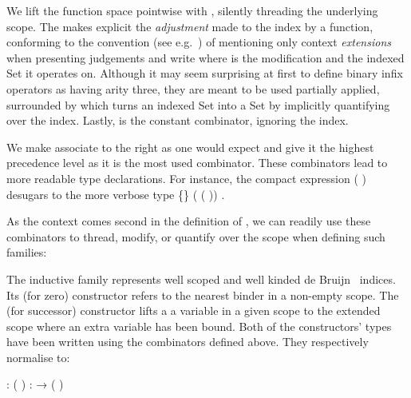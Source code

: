 We lift the function space pointwise with , silently threading the
underlying scope. The  makes explicit the \emph{adjustment} made to the index
by a function, conforming to the convention (see e.g.~\cite{martin1982constructive}) of mentioning only
context \emph{extensions} when presenting judgements
and write    where  is the modification and  the indexed
Set it operates on. Although it may seem surprising at first to define binary
infix operators as having arity three, they are meant to be used partially applied,
surrounded by  which turns an indexed Set into a Set by implicitly
quantifying over the index.
Lastly,  is the constant combinator, ignoring the index.

We make  associate to the right as one would expect and give it the
highest precedence level as it is the most used combinator. These combinators
lead to more readable type declarations.  For instance, the compact expression
\AF{∀[}   (   )   \AF{]}
desugars to the more verbose type
 \{\}  (   ( ))   .

As the context comes second in the definition of , we
can readily use these combinators to thread, modify, or quantify over the
scope when defining such families:

\begin{minipage}[t]{0.35\textwidth}
\end{minipage}\hfill
\begin{minipage}[t]{0.55\textwidth}
\end{minipage}

The inductive family  represents well scoped and well kinded
de Bruijn~\citeyear{de1972lambda}
indices. Its  (for zero) constructor refers to
the nearest binder in a non-empty scope. The  (for successor) constructor lifts a
a variable in a given scope to the extended scope where
an extra variable has been bound. Both of the constructors' types have been written using the combinators defined above.
They respectively normalise to:
\begin{center}
   : {      ( \AIC{::} )}
  \qquad
   : {    →       ( \AIC{::} )}
\end{center}

